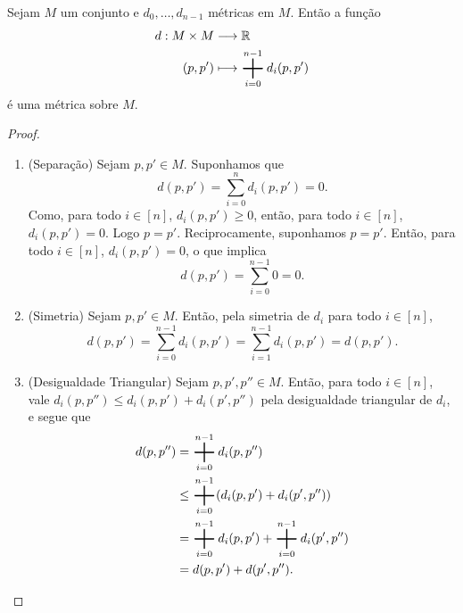 \begin{prop}
Sejam $M$ um conjunto e $d_0, \dots, d_{n-1}$ métricas em $M$. Então a função
	\begin{align*}
		\func{d}{M \times M}{\R}{(p,p')}{\sum_{i=0}^{n-1} d_i(p,p')}
	\end{align*}
é uma métrica sobre $M$.
\end{prop}
\begin{proof}
	\begin{enumerate}
	\item (Separação) Sejam $p,p' \in M$. Suponhamos que
	\begin{equation*}
	d(p,p') = \sum_{i=0}^n d_i(p,p') = 0.
	\end{equation*}
Como, para todo $i \in [n]$, $d_i(p,p') \geq 0$, então, para todo $i \in [n]$, $d_i(p,p') = 0$. Logo $p=p'$. Reciprocamente, suponhamos $p=p'$. Então, para todo $i \in [n]$, $d_i(p,p')=0$, o que implica
	\begin{equation*}
	d(p,p') = \sum_{i=0}^{n-1} 0 = 0.
	\end{equation*}
	
	\item (Simetria) Sejam $p,p' \in M$. Então, pela simetria de $d_i$ para todo $i \in [n]$,
	\begin{equation*}
	d(p,p') = \sum_{i=0}^{n-1} d_i(p,p') = \sum_{i=1}^{n-1} d_i(p,p') = d(p,p').
	\end{equation*}
	
	\item (Desigualdade Triangular) Sejam $p,p',p'' \in M$. Então, para todo $i \in [n]$, vale $d_i(p,p'') \leq d_i(p,p')+d_i(p',p'')$ pela desigualdade triangular de $d_i$, e segue que
	\begin{align*}
	d(p,p'') &= \sum_{i=0}^{n-1} d_i(p,p'') \\
				&\leq \sum_{i=0}^{n-1} (d_i(p,p')+d_i(p',p'')) \\
				&= \sum_{i=0}^{n-1} d_i(p,p') + \sum_{i=0}^{n-1} d_i(p',p'') \\
				&= d(p,p')+d(p',p''). \qedhere
	\end{align*}
	\end{enumerate}
\end{proof}

